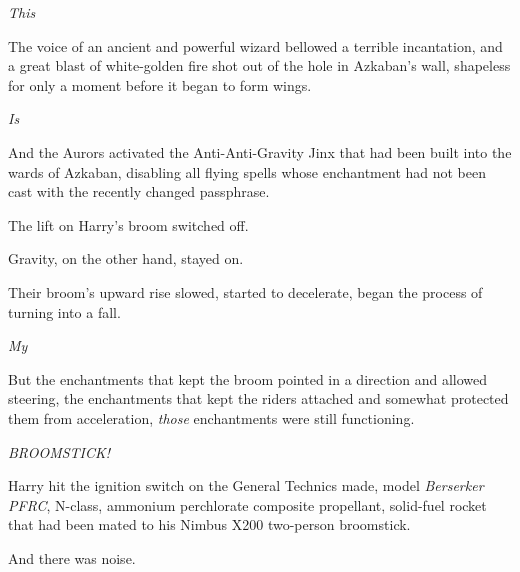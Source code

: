 \emph{This{\el}}

The voice of an ancient and powerful wizard bellowed a terrible incantation,
and a great blast of white-golden fire shot out of the hole in Azkaban's wall,
shapeless for only a moment before it began to form wings.

\emph{Is{\el}}

And the Aurors activated the Anti-Anti-Gravity Jinx that had been built into
the wards of Azkaban, disabling all flying spells whose enchantment had not
been cast with the recently changed passphrase.

The lift on Harry's broom switched off.

Gravity, on the other hand, stayed on.

Their broom's upward rise slowed, started to decelerate, began the process of
turning into a fall.

\emph{My{\el}}

But the enchantments that kept the broom pointed in a direction and allowed
steering, the enchantments that kept the riders attached and somewhat protected
them from acceleration, \emph{those} enchantments were still functioning.

\emph{BROOMSTICK!}

Harry hit the ignition switch on the General Technics made, model
\emph{Berserker PFRC}, N-class, ammonium perchlorate composite propellant,
solid-fuel rocket that had been mated to his Nimbus X200 two-person broomstick.

And there was noise.
